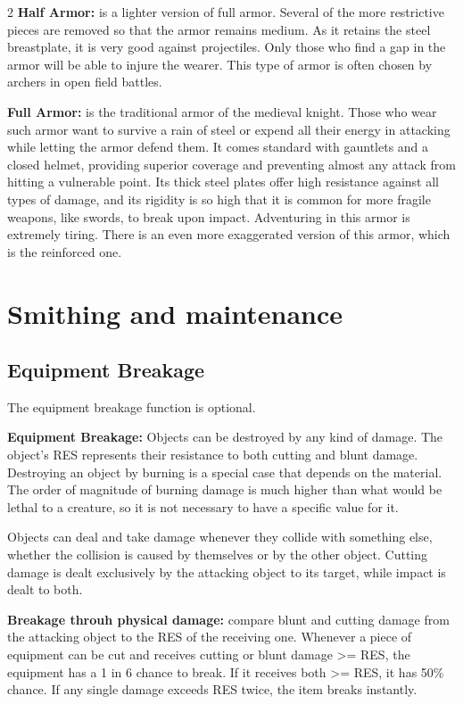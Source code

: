 \begin{multicols}{2}
\textbf{Half Armor: } is a lighter version of full armor. Several of the more restrictive pieces are removed so that the armor remains medium. As it retains the steel breastplate, it is very good against projectiles. Only those who find a gap in the armor will be able to injure the wearer. This type of armor is often chosen by archers in open field battles.

\textbf{Full Armor: } is the traditional armor of the medieval knight. Those who wear such armor want to survive a rain of steel or expend all their energy in attacking while letting the armor defend them. It comes standard with gauntlets and a closed helmet, providing superior coverage and preventing almost any attack from hitting a vulnerable point. Its thick steel plates offer high resistance against all types of damage, and its rigidity is so high that it is common for more fragile weapons, like swords, to break upon impact. Adventuring in this armor is extremely tiring. There is an even more exaggerated version of this armor, which is the reinforced one.

\section{Smithing and maintenance}

\subsection{Equipment Breakage}

The equipment breakage function is optional.

\textbf{Equipment Breakage:} Objects can be destroyed by any kind of damage. The object's RES represents their resistance to both cutting and blunt damage. Destroying an object by burning is a special case that depends on the material. The order of magnitude of burning damage is much higher than what would be lethal to a creature, so it is not necessary to have a specific value for it.

Objects can deal and take damage whenever they collide with something else, whether the collision is caused by themselves or by the other object. Cutting damage is dealt exclusively by the attacking object to its target, while impact is dealt to both.

\textbf{Breakage throuh physical damage:} compare blunt and cutting damage from the attacking object to the RES of the receiving one. Whenever a piece of equipment can be cut and receives cutting or blunt damage >= RES, the equipment has a 1 in 6 chance to break. If it receives both >= RES, it has 50\% chance. If any single damage exceeds RES twice, the item breaks instantly.


\end{multicols}
